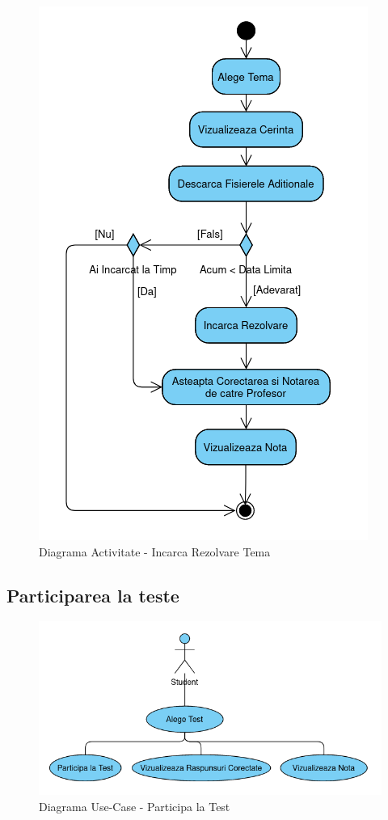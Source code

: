\documentclass[12pt, a4paper, oneside, romanian]{teza-upb}
\begin{document}
\begin{figure}[H]
\centering
\includegraphics*[width=0.55\columnwidth]{diagrama-activitate-incarca-rezolvare-tema}
\caption{Diagrama Activitate - Incarca Rezolvare Tema}
\label{diagrama-activitate-incarca-rezolvare-tema}
\end{figure}


\subsection{Participarea la teste}

\begin{figure}[H]
\centering
\includegraphics*[width=0.75\columnwidth]{diagrama-use-case-participa-la-test}
\caption{Diagrama Use-Case - Participa la Test}
\label{diagrama-use-case-participa-la-test}
\end{figure}
\end{document}
